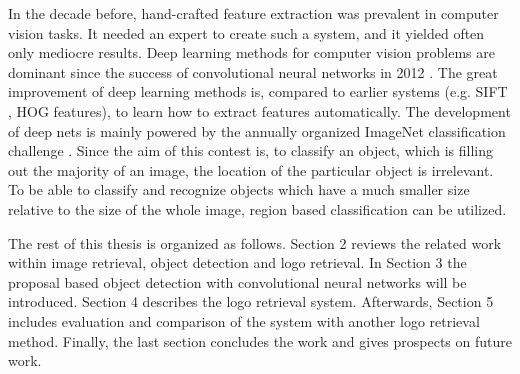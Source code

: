 In the decade before, hand-crafted feature extraction was prevalent in computer vision tasks. It needed an expert to create such a system, and it yielded often only mediocre results. Deep learning methods for computer vision problems are dominant since the success of convolutional neural networks in 2012 \cite{NIPS2012_4824}. The great improvement of deep learning methods is, compared to earlier systems (e.g. SIFT \cite{Lowe:2004:DIF:993451.996342}, HOG \cite{Dalal:2005:HOG:1068507.1069007} features), to learn how to extract features automatically. The development of deep nets is mainly powered by the annually organized ImageNet classification challenge \cite{ILSVRC15}. Since the aim of this contest is, to classify an object, which is filling out the majority of an image, the location of the particular object is irrelevant. To be able to classify and recognize objects which have a much smaller size relative to the size of the whole image, region based classification can be utilized.

The rest of this thesis is organized as follows. Section 2 reviews the related work within image retrieval, object detection and logo retrieval. In Section 3 the proposal based object detection with convolutional neural networks will be introduced. Section 4 describes the logo retrieval system. Afterwards, Section 5 includes evaluation and comparison of the system with another logo retrieval method. Finally, the last section concludes the work and gives prospects on future work.